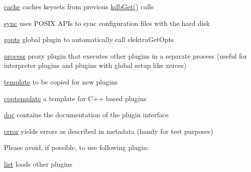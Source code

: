 \begin{DoxyItemize}
\item \hyperlink{autotoc_md70_src_plugins_cache_README_md}{cache} caches keysets from previous {\ttfamily \hyperlink{group__kdb_ga28e385fd9cb7ccfe0b2f1ed2f62453a1}{kdb\+Get()}} calls
\item \hyperlink{autotoc_md631_src_plugins_sync_README_md}{sync} uses P\+O\+S\+IX A\+P\+Is to sync configuration files with the hard disk
\item \hyperlink{autotoc_md244_src_plugins_gopts_README_md}{gopts} global plugin to automatically call {\ttfamily elektra\+Get\+Opts}
\item \hyperlink{autotoc_md501_src_plugins_process_README_md}{process} proxy plugin that executes other plugins in a separate process (useful for interpreter plugins and plugins with global setup like {\ttfamily xerces})
\end{DoxyItemize}


\begin{DoxyItemize}
\item \hyperlink{autotoc_md634_src_plugins_template_README_md}{template} to be copied for new plugins
\item \hyperlink{autotoc_md106_src_plugins_cpptemplate_README_md}{cpptemplate} a template for C++ based plugins
\item \hyperlink{autotoc_md192_src_plugins_doc_README_md}{doc} contains the documentation of the plugin interface
\item \hyperlink{autotoc_md199_src_plugins_error_README_md}{error} yields errors as described in metadata (handy for test purposes)
\end{DoxyItemize}

Please avoid, if possible, to use following plugin\+:


\begin{DoxyItemize}
\item \hyperlink{autotoc_md358_src_plugins_list_README_md}{list} loads other plugins 
\end{DoxyItemize}